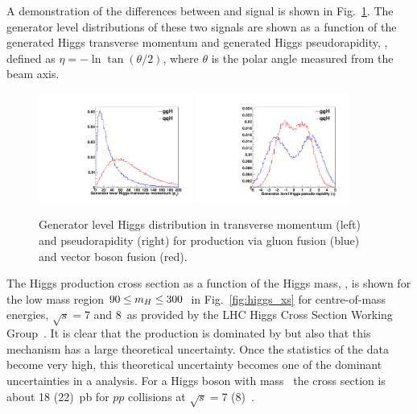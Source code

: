 A demonstration of the differences between \ggH and \VBF signal is shown in Fig.~\ref{fig:gen_level}. The generator level distributions of these two signals are shown as a function of the generated Higgs transverse momentum and generated Higgs pseudorapidity, \eta, defined as $\eta=-\ln\tan(\theta/2)$, where $\theta$ is the polar angle measured from the beam axis. 
\begin{figure}
  \includegraphics[width=0.45\textwidth]{theory/plots/genPT.pdf}
  \includegraphics[width=0.45\textwidth]{theory/plots/genEta.pdf}
  \caption[Generator level Higgs distributions]{Generator level Higgs distribution in transverse momentum (left) and pseudorapidity (right) for production via gluon fusion (blue) and vector boson fusion (red).}
  \label{fig:gen_level}
\end{figure}

The \SM Higgs production cross section as a function of the Higgs mass, \mH, is shown for the low mass region $90\leq m_{H}\leq 300$~\GeV in Fig.~\ref{fig:higgs_xs} for centre-of-mass energies, $\sqrt{s}=7$ and 8~\TeV as provided by the LHC Higgs Cross Section Working Group~\cite{LHCHiggsCrossSectionWorkingGroup3}. It is clear that the production is dominated by \ggH but also that this mechanism has a large theoretical uncertainty. Once the statistics of the \LHC data become very high, this theoretical uncertainty becomes one of the dominant uncertainties in a \Hgg analysis. For a \SM Higgs boson with mass ~\GeV the cross section is about 18 (22)~pb for $pp$ collisions at $\sqrt{s}=$7 (8)~\TeV.

